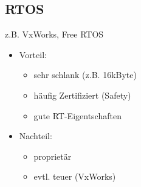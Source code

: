 \documentclass[12pt,a4paper,oneside,ngerman]{article}
\begin{document}
\subsection{RTOS}
z.B. VxWorks, Free RTOS\\
\begin{itemize}
	\item Vorteil:
	\begin{itemize}
		\item sehr schlank (z.B. 16kByte)
		\item häufig Zertifiziert (Safety)
		\item gute RT-Eigentschaften
	\end{itemize}
	\item Nachteil:
	\begin{itemize}
		\item proprietär
		\item evtl. teuer (VxWorks)
	\end{itemize}
\end{itemize}
\end{document}
